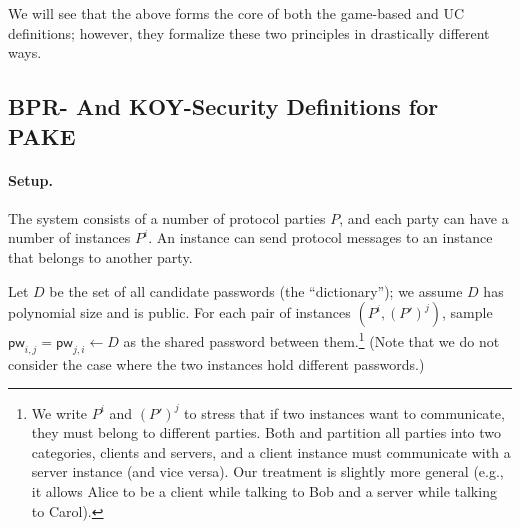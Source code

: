 \documentclass{article}
\newcommand{\pw}{\mathsf{pw}}
\begin{document}
We will see that the above forms the core of both the game-based and UC definitions; however, they formalize these two principles in drastically different ways.
\subsection{BPR- And KOY-Security Definitions for PAKE}
\paragraph{Setup.}
The system consists of a number of protocol parties $P$, and each party can have a number of instances $P^i$. An instance can send protocol messages to an instance that belongs to another party.

Let $D$ be the set of all candidate passwords (the ``dictionary''); we assume $D$ has polynomial size and is public. For each pair of instances $(P^i, (P')^j)$, sample $\pw_{i,j} = \pw_{j,i} \gets D$ as the shared password between them.\footnote{We write $P^i$ and $(P')^j$ to stress that if two instances want to communicate, they must belong to different parties. Both \cite{EC:BelPoiRog00} and \cite{JACM:KatOstYun09} partition all parties into two categories, clients and servers, and a client instance must communicate with a server instance (and vice versa). Our treatment is slightly more general (e.g., it allows Alice to be a client while talking to Bob and a server while talking to Carol).} (Note that we do not consider the case where the two instances hold different passwords.)
\end{document}
